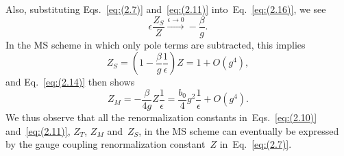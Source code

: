 Also, substituting Eqs.~\eqref{eq:(2.7)} and~\eqref{eq:(2.11)}
into~Eq.~\eqref{eq:(2.16)}, we see
\begin{equation}
   \epsilon\frac{Z_S}{Z}
   \xrightarrow{\epsilon\to0}
   -\frac{\beta}{g}.
\label{eq:(2.20)}
\end{equation}
In the MS scheme in which only pole terms are subtracted, this implies
\begin{equation}
   Z_S=\left(1-\frac{\beta}{g}\frac{1}{\epsilon}\right)Z
   =1+O(g^4),
\label{eq:(2.21)}
\end{equation}
and Eq.~\eqref{eq:(2.14)} then shows
\begin{equation}
   Z_M=-\frac{\beta}{4g}Z\frac{1}{\epsilon}
   =\frac{b_0}{4}g^2\frac{1}{\epsilon}+O(g^4).
\label{eq:(2.22)}
\end{equation}
We thus observe that all the renormalization constants
in~Eqs.~\eqref{eq:(2.10)} and~\eqref{eq:(2.11)}, $Z_T$, $Z_M$ and~$Z_S$, in the
MS scheme can eventually be expressed by the gauge coupling renormalization
constant~$Z$ in~Eq.~\eqref{eq:(2.7)}.
